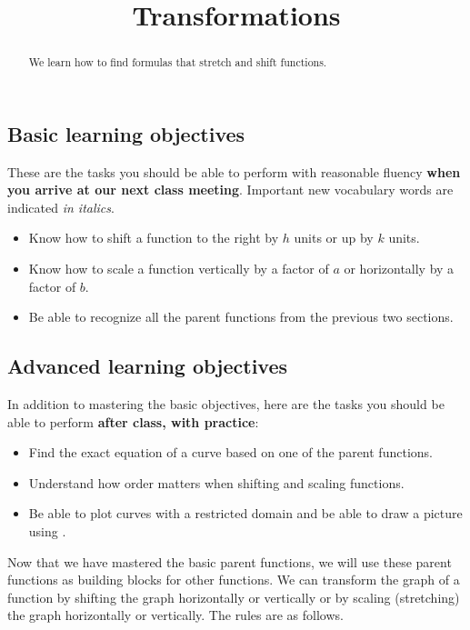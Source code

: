 \documentclass{ximera}
\title{Transformations}
\begin{document}
\begin{abstract}
We learn how to find formulas that stretch and shift functions.
\end{abstract}
\maketitle

\subsection*{Basic learning objectives}

These are the tasks you should be able to perform with reasonable fluency \textbf{when you arrive at our next class meeting}. Important new vocabulary words are indicated \emph{in italics}. 

\begin{itemize}
	\item Know how to shift a function to the right by $h$ units or up by $k$ units.
	\item Know how to scale a function vertically by a factor of $a$ or horizontally by a factor of $b$.
	\item Be able to recognize all the parent functions from the previous two sections.
\end{itemize}

\subsection*{Advanced learning objectives}

In addition to mastering the basic objectives, here are the tasks you should be able to perform \textbf{after class, with practice}: 

\begin{itemize}
	\item Find the exact equation of a curve based on one of the parent functions.
    \item Understand how order matters when shifting and scaling functions.
    \item Be able to plot curves with a restricted domain and be able to draw a picture using .
\end{itemize}

\noindent\hrulefill

Now that we have mastered the basic parent functions, we will use these parent functions as building blocks for other functions. We can transform the graph of a function by shifting the graph horizontally or vertically or by scaling (stretching) the graph horizontally or vertically. The rules are as follows.
\end{document}
